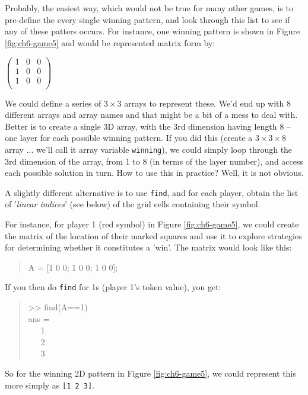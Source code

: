 \documentclass{tufte-book} %
\newenvironment{docspec}{\begin{quotation}\ttfamily\parskip0pt\parindent0pt\ignorespaces}{\end{quotation}}
\begin{document}
Probably, the easiest way, which would not be true for many other games, is to pre-define the every single winning pattern, and look through this list to see if any of these patters occurs. For instance, one winning pattern is shown in Figure \ref{fig:ch6-game5} and would be represented matrix form by:

\vspace{2mm}
\(\begin{pmatrix}1 & 0 & 0 \\
1 & 0 & 0 \\
1 & 0 & 0 \\
\end{pmatrix}\)
\vspace{2mm}

We could define a series of \(3\times 3\) arrays to represent these. We'd end up with 8 different arrays and array names and that might be a bit of a mess to deal with. Better is to create a single 3D array, with the 3rd dimension having length 8 -- one layer for each possible winning pattern. If you did this (create a \(3\times 3\times 8\) array ... we'll call it array variable \texttt{winning}), we could simply loop through the 3rd dimension of the array, from 1 to 8 (in terms of the layer number), and access each possible solution in turn. How to use this in practice? Well, it is not obvious.

A slightly different alternative is to use \texttt{find}, and for each player, obtain the list of '\textit{linear indices}' (see below) of the grid cells containing their symbol.

For instance, for player 1 (red symbol)  in Figure \ref{fig:ch6-game5}, we could create the matrix of the location of their marked squares and use it to explore strategies for determining whether it constitutes a 'win'. The matrix would look like this:
\begin{docspec}
A = [1 0 0; 1 0 0; 1 0 0];
\end{docspec}
If you then do \texttt{find} for 1s (player 1's token value), you get:
\begin{docspec}
>> find(A==1)\\
ans =\\
\ \ \      1\\
\ \ \      2\\
\ \ \      3
\end{docspec}
So for the winning 2D pattern in Figure \ref{fig:ch6-game5},  we could represent this more simply as \texttt{[1 2 3]}. 
\end{document}
